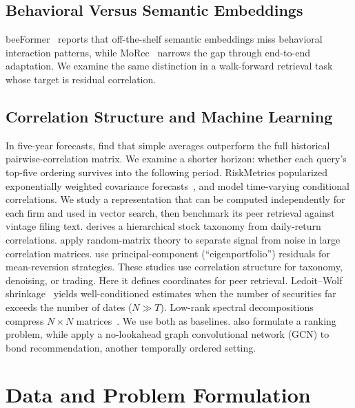 \documentclass[sigconf,anonymous]{acmart}
\begin{document}
\subsection{Behavioral Versus Semantic Embeddings}
beeFormer~\citep{vancura2024beeformer} reports that off-the-shelf semantic
embeddings miss behavioral interaction patterns, while
MoRec~\citep{yuan2023morec} narrows the gap through end-to-end adaptation.  We
examine the same distinction in a walk-forward retrieval task whose target is
residual correlation.

\subsection{Correlation Structure and Machine Learning}
In five-year forecasts, \citet{elton1973dependence} find that simple averages
outperform the full historical pairwise-correlation matrix.  We examine a
shorter horizon: whether each query's top-five ordering survives into the
following period.
RiskMetrics popularized exponentially weighted covariance
forecasts~\citep{jpmorgan1996riskmetrics}, and \citet{engle2002dcc} model
time-varying conditional correlations.  We study a representation that can be
computed independently for each firm and used in vector search, then benchmark
its peer retrieval against vintage filing text.
\citet{mantegna1999hierarchical} derives a hierarchical stock taxonomy from
daily-return correlations.  \citet{laloux1999noise} apply random-matrix theory
to separate signal from noise in large correlation matrices.
\citet{avellaneda2010statistical} use principal-component
(``eigenportfolio'') residuals for mean-reversion strategies.  These studies use
correlation structure for taxonomy, denoising, or trading.  Here it defines
coordinates for peer retrieval.
Ledoit--Wolf shrinkage~\citep{ledoit2004well} yields well-conditioned estimates
when the number of securities far exceeds the number of dates ($N \gg T$).
Low-rank spectral decompositions compress $N{\times}N$
matrices~\citep{golub2013matrix}.  We use both as baselines.
\citet{feng2019temporal} also formulate a ranking problem, while
\citet{ghiye2024rolling} apply a no-lookahead graph convolutional network (GCN)
to bond recommendation, another temporally ordered setting.

\section{Data and Problem Formulation}
\label{sec:data}
\end{document}
